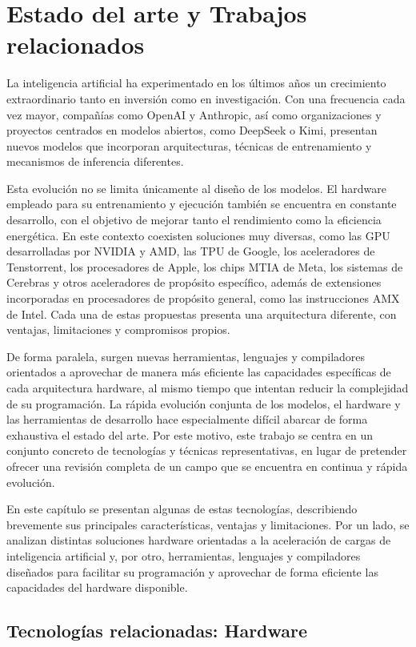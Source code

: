 \chapter{Estado del arte y Trabajos relacionados}
La inteligencia artificial ha experimentado en los últimos años un crecimiento extraordinario tanto en inversión como en investigación. Con una frecuencia cada vez mayor, compañías como OpenAI y Anthropic, así como organizaciones y proyectos centrados en modelos abiertos, como DeepSeek o Kimi, presentan nuevos modelos que incorporan arquitecturas, técnicas de entrenamiento y mecanismos de inferencia diferentes.

Esta evolución no se limita únicamente al diseño de los modelos. El hardware empleado para su entrenamiento y ejecución también se encuentra en constante desarrollo, con el objetivo de mejorar tanto el rendimiento como la eficiencia energética. En este contexto coexisten soluciones muy diversas, como las GPU desarrolladas por NVIDIA y AMD, las TPU de Google, los aceleradores de Tenstorrent, los procesadores de Apple, los chips MTIA de Meta, los sistemas de Cerebras y otros aceleradores de propósito específico, además de extensiones incorporadas en procesadores de propósito general, como las instrucciones AMX de Intel. Cada una de estas propuestas presenta una arquitectura diferente, con ventajas, limitaciones y compromisos propios.

De forma paralela, surgen nuevas herramientas, lenguajes y compiladores orientados a aprovechar de manera más eficiente las capacidades específicas de cada arquitectura hardware, al mismo tiempo que intentan reducir la complejidad de su programación. La rápida evolución conjunta de los modelos, el hardware y las herramientas de desarrollo hace especialmente difícil abarcar de forma exhaustiva el estado del arte. Por este motivo, este trabajo se centra en un conjunto concreto de tecnologías y técnicas representativas, en lugar de pretender ofrecer una revisión completa de un campo que se encuentra en continua y rápida evolución.

En este capítulo se presentan algunas de estas tecnologías, describiendo brevemente sus principales características, ventajas y limitaciones. Por un lado, se analizan distintas soluciones hardware orientadas a la aceleración de cargas de inteligencia artificial y, por otro, herramientas, lenguajes y compiladores diseñados para facilitar su programación y aprovechar de forma eficiente las capacidades del hardware disponible.


\section{Tecnologías relacionadas: Hardware}
